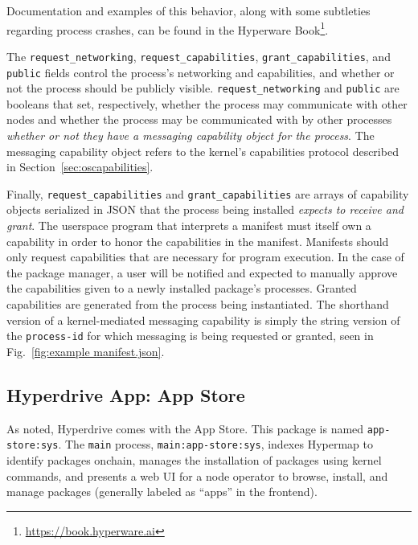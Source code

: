 \documentclass[runningheads]{llncs}
\begin{document}
Documentation and examples of this behavior, along with some subtleties regarding process crashes, can be found in the Hyperware Book\footnote{\url{https://book.hyperware.ai}}.

The \verb|request_networking|, \verb|request_capabilities|, \verb|grant_capabilities|, and \verb|public| fields control the process's networking and capabilities, and whether or not the process should be publicly visible.
\verb|request_networking| and \verb|public| are booleans that set, respectively, whether the process may communicate with other nodes and whether the process may be communicated with by other processes \textit{whether or not they have a messaging capability object for the process}.
The messaging capability object refers to the kernel's capabilities protocol described in Section~\ref{sec:oscapabilities}.

Finally, \verb|request_capabilities| and \verb|grant_capabilities| are arrays of capability objects serialized in JSON that the process being installed \textit{expects to receive and grant}.
The userspace program that interprets a manifest must itself own a capability in order to honor the capabilities in the manifest.
Manifests should only request capabilities that are necessary for program execution.
In the case of the package manager, a user will be notified and expected to manually approve the capabilities given to a newly installed package's processes.
Granted capabilities are generated from the process being instantiated.
The shorthand version of a kernel-mediated messaging capability is simply the string version of the \verb|process-id| for which messaging is being requested or granted, seen in Fig.~\ref{fig:example manifest.json}.

\subsection{Hyperdrive App: App Store}
\label{sec:appstore}

As noted, Hyperdrive comes with the App Store.
This package is named \verb|app-store:sys|.
The \verb|main| process, \verb|main:app-store:sys|, indexes Hypermap to identify packages onchain, manages the installation of packages using kernel commands, and presents a web UI for a node operator to browse, install, and manage packages (generally labeled as ``apps'' in the frontend).
\end{document}
